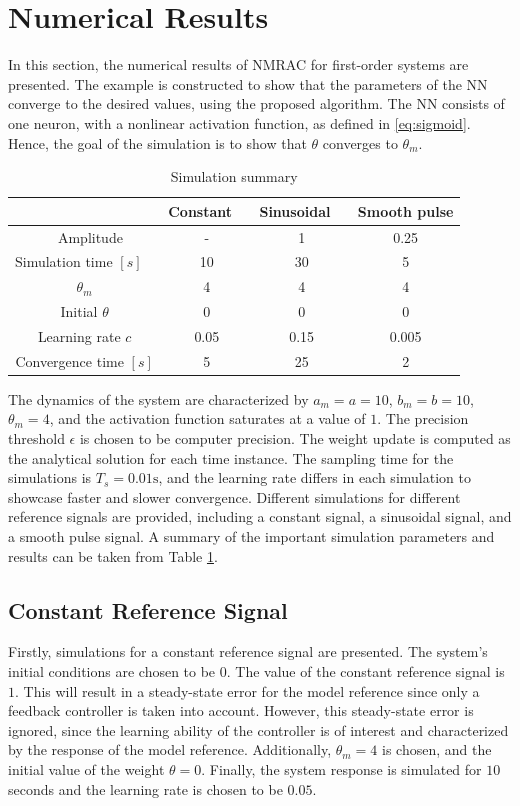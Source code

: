 \section{Numerical Results}
\label{sec:results}
In this section, the numerical results of NMRAC for first-order systems are presented. The example is constructed to show that the parameters of the NN converge to the desired values, using the proposed algorithm. The NN consists of one neuron, with a nonlinear activation function, as defined in \eqref{eq:sigmoid}. Hence, the goal of the simulation is to show that $\theta$ converges to $\theta_m$.

\begin{table}
    \centering
    \caption{Simulation summary}\label{tab:sim-settings}
    \begin{tabular}{ c c c c } 
         \hline
         & Constant  & Sinusoidal  & Smooth pulse \\
         \hline  
 Amplitude & - & 1 & 0.25 \\
 Simulation time $[s]$  & 10 & 30 & 5 \\
         $\theta_m$ & 4 & 4 & 4 \\
 Initial $\theta$ & 0 & 0 & 0 \\
 Learning rate $c$ & 0.05 & 0.15 & 0.005\\
 Convergence time $[s]$ & 5 & 25 & 2 \\
         \hline
    \end{tabular}
\end{table}

The dynamics of the system are characterized by $a_m=a=10$, $b_m=b=10$, $\theta_m=4$, and the activation function saturates at a value of $1$. The precision threshold $\epsilon$ is chosen to be computer precision. The weight update is computed as the analytical solution for each time instance. The sampling time for the simulations is $T_s=0.01\textrm{s}$, and the learning rate differs in each simulation to showcase faster and slower convergence. Different simulations for different reference signals are provided, including a constant signal, a sinusoidal signal, and a smooth pulse signal. A summary of the important simulation parameters and results can be taken from Table \ref{tab:sim-settings}.

\subsection{Constant Reference Signal}
Firstly, simulations for a constant reference signal are presented. The system's initial conditions are chosen to be $0$. The value of the constant reference signal is $1$. This will result in a steady-state error for the model reference since only a feedback controller is taken into account. However, this steady-state error is ignored, since the learning ability of the controller is of interest and characterized by the response of the model reference. Additionally, $\theta_m=4$ is chosen, and the initial value of the weight $\theta=0$. Finally, the system response is simulated for $10$ seconds and the learning rate is chosen to be $0.05$.

